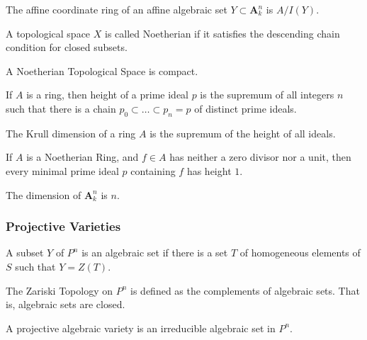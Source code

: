\documentclass[crop=false,class=article,oneside]{standalone}
\begin{document}
            \begin{definition}
                The affine coordinate ring of an affine
                algebraic set $Y\subset\textbf{A}_{k}^{n}$
                is $A/I(Y)$.
            \end{definition}
            \begin{definition}
                A topological space $X$ is called Noetherian
                if it satisfies the descending chain condition
                for closed subsets.
            \end{definition}
            \begin{theorem}
                A Noetherian Topological Space is compact.
            \end{theorem}
            \begin{definition}
                If $A$ is a ring, then height of a prime
                ideal $p$ is the supremum of all integers $n$
                such that there is a chain
                $p_{0}\subset\hdots\subset{p_{n}}=p$
                of distinct prime ideals.
            \end{definition}
            \begin{definition}
                The Krull dimension of a ring $A$ is the
                supremum of the height of all ideals.
            \end{definition}
            \begin{theorem}
                If $A$ is a Noetherian Ring, and $f\in A$
                has neither a zero divisor nor a unit,
                then every minimal prime ideal $p$
                containing $f$ has height $1$.
            \end{theorem}
            \begin{theorem}
                The dimension of $\textbf{A}_{k}^{n}$ is $n$.
            \end{theorem}
        \subsubsection{Projective Varieties}
            \begin{definition}
                A subset $Y$ of $P^n$ is an algebraic
                set if there is a set $T$ of homogeneous
                elements of $S$ such that $Y=Z(T)$.
            \end{definition}
            \begin{definition}
                The Zariski Topology on $P^n$ is defined
                as the complements of algebraic sets.
                That is, algebraic sets are closed.
            \end{definition}
            \begin{definition}
                A projective algebraic variety is an
                irreducible algebraic set in $P^{n}$.
            \end{definition}
\end{document}
